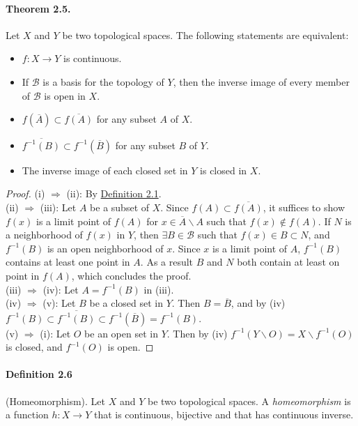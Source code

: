 \documentclass{article}
\numberwithin{equation}{section}
\theoremstyle{plain}
\theoremstyle{definition}
\begin{document}
\paragraph{Theorem 2.5. \label{thm:2.5}} Let $X$ and $Y$ be two topological spaces. The following statements are equivalent:
\begin{itemize}
	\item[(i)] $f:X\to Y$ is continuous.
	\item[(ii)] If $\mathscr{B}$ is a basis for the topology of $Y$, then the inverse image of every member of $\mathscr{B}$ is open in $X$.
	\item[(iii)] $f(\overline{A}) \subset \overline{f(A)}$ for any subset $A$ of $X$.
	\item[(iv)] $\overline{f^{-1}(B)}\subset f^{-1}(\overline{B})$ for any subset $B$ of $Y$.
	\item[(v)] The inverse image of each closed set in $Y$ is closed in $X$.
\end{itemize}
\begin{proof}
(i) $\Rightarrow$ (ii): By \hyperref[def:2.1]{Definition 2.1}.\\
(ii) $\Rightarrow$ (iii): Let $A$ be a subset of $X$. Since $f(A)\subset\overline{f(A)}$, it suffices to show $f(x)$ is a limit point of $f(A)$ for $x\in \overline{A}\backslash A$ such that $f(x)\notin f(A)$. If $N$ is a neighborhood of $f(x)$ in $Y$, then $\exists B\in\mathscr{B}$ such that $f(x)\in B\subset N$, and $f^{-1}(B)$ is an open neighborhood of $x$. Since $x$ is a limit point of $A$, $f^{-1}(B)$ contains at least one point in $A$. As a result $B$ and $N$ both contain at least on point in $f(A)$, which concludes the proof.\\
(iii) $\Rightarrow$ (iv): Let $A = f^{-1}(B)$ in (iii).\\
(iv) $\Rightarrow$ (v): Let $B$ be a closed set in $Y$. Then $B=\overline{B}$, and by (iv) $f^{-1}(B) \subset\overline{f^{-1}(B)}\subset f^{-1}(\overline{B}) = f^{-1}(B)$. \\
(v) $\Rightarrow$ (i): Let $O$ be an open set in $Y$. Then by (iv) $f^{-1}(Y\backslash O) = X\backslash f^{-1}(O)$ is closed, and $f^{-1}(O)$ is open.
\end{proof}

\paragraph{Definition 2.6\label{def:2.6}} (Homeomorphism). Let $X$ and $Y$ be two topological spaces. A \textit{homeomorphism} is a function $h:X\to Y$ that is continuous, bijective and that has continuous inverse.
\end{document}
